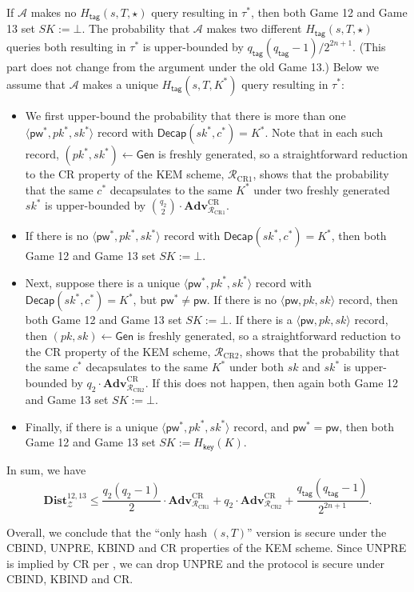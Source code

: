\documentclass{article}
\theoremstyle{plain}
\theoremstyle{definition}
\theoremstyle{remark}
\newcommand{\adv}{\mathcal{A}}
\newcommand{\env}{\mathcal{Z}}
\newcommand{\red}{\mathcal{R}}
\newcommand{\Adv}{\mathbf{Adv}}
\newcommand{\Dist}{\mathbf{Dist}}
\newcommand{\Gen}{\mathsf{Gen}}
\newcommand{\Decap}{\mathsf{Decap}}
\newcommand{\Hkey}{H_\mathsf{key}}
\newcommand{\Htag}{H_\mathsf{tag}}
\newcommand{\pw}{\mathsf{pw}}
\newcommand{\qtag}{q_\mathsf{tag}}
\begin{document}
If $\adv$ makes no $\Htag(s,T,\star)$ query resulting in $\tau^*$, then both Game 12 and Game 13 set $SK := \bot$. The probability that $\adv$ makes two different $\Htag(s,T,\star)$ queries both resulting in $\tau^*$ is upper-bounded by $\qtag(\qtag-1)/2^{2n+1}$. (This part does not change from the argument under the old Game 13.) Below we assume that $\adv$ makes a unique $\Htag(s,T,K^*)$ query resulting in $\tau^*$:
\begin{itemize}
  \item We first upper-bound the probability that there is more than one $\langle\pw^*,pk^*,\allowbreak sk^*\rangle$ record with $\Decap(sk^*,c^*) = K^*$. Note that in each such record, $(pk^*,sk^*) \gets \Gen$ is freshly generated, so a straightforward reduction to the CR property of the KEM scheme, $\red_\text{CR1}$, shows that the probability that the same $c^*$ decapsulates to the same $K^*$ under two freshly generated $sk^*$ is upper-bounded by ${q_2 \choose 2} \cdot \Adv_{\red_\text{CR1}}^\text{CR}$.
  \item If there is no $\langle\pw^*,pk^*,sk^*\rangle$ record with $\Decap(sk^*,c^*) = K^*$, then both Game 12 and Game 13 set $SK := \bot$.
  \item Next, suppose there is a unique $\langle\pw^*,pk^*,sk^*\rangle$ record with $\Decap(sk^*,c^*) = K^*$, but $\pw^* \neq \pw$. If there is no $\langle\pw,pk,sk\rangle$ record, then both Game 12 and Game 13 set $SK := \bot$. If there is a $\langle\pw,pk,sk\rangle$ record, then $(pk,sk) \gets \Gen$ is freshly generated, so a straightforward reduction to the CR property of the KEM scheme, $\red_\text{CR2}$, shows that the probability that the same $c^*$ decapsulates to the same $K^*$ under both $sk$ and $sk^*$ is upper-bounded by $q_2 \cdot \Adv_{\red_\text{CR2}}^\text{CR}$. If this does not happen, then again both Game 12 and Game 13 set $SK := \bot$.
  \item Finally, if there is a unique $\langle\pw^*,pk^*,sk^*\rangle$ record, and $\pw^* = \pw$, then both Game 12 and Game 13 set $SK := \Hkey(K)$.
\end{itemize}

In sum, we have
\[
\Dist_\env^{12,13} \leq \frac{q_2(q_2-1)}{2} \cdot \Adv_{\red_\text{CR1}}^\text{CR} + q_2 \cdot \Adv_{\red_\text{CR2}}^\text{CR} + \frac{\qtag(\qtag-1)}{2^{2n+1}}.
\]

Overall, we conclude that the ``only hash $(s,T)$'' version is secure under the CBIND, UNPRE, KBIND and CR properties of the KEM scheme. Since UNPRE is implied by CR per , we can drop UNPRE and the protocol is secure under CBIND, KBIND and CR.
\end{document}
